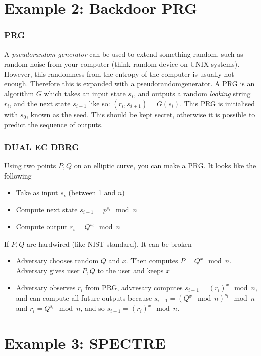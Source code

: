 \section{Example 2: Backdoor PRG}
\begin{frame}
    \frametitle{PRG}
        A \textit{pseudorandom generator} can be used to extend something random, such as random noise from your computer (think random device on UNIX systems). However, this randomness from the entropy of the computer is usually not enough. Therefore this is expanded with a pseudorandomgenerator. A PRG is an algorithm $G$ which takes an input state $s_i$, and outputs a random \textit{looking} string $r_i$, and the next state $s_{i + 1}$ like so: $(r_i, s_{i +1}) = G(s_i)$. This PRG is initialised with $s_0$, known as the seed. This should be kept secret, otherwise it is possible to predict the sequence of outputs. 
\end{frame}
    \begin{frame}
        \frametitle{DUAL EC DBRG}
            Using two points $P, Q$ on an elliptic curve, you can make a PRG. It looks like the following
            \begin{itemize}
                \item Take as input $s_i$ (between 1 and $n$)
                \item Compute next state $s_{i + 1} = p^{s_i} \mod n$
                \item Compute output $r_i = Q^{s_i} \mod n$
            \end{itemize}
            If $P, Q$ are hardwired (like NIST standard). It can be broken
            \begin{itemize}
                \item Adversary chooses random $Q$ and $x$. Then computes $P = Q^x \mod n$. Adversary gives user $P, Q$ to the user and keeps $x$
                \item Adversary observes $r_i$ from PRG, advresary computes $s_{i + 1} = (r_i)^x \mod n$, and can compute all future outputs because $s_{i + 1} = (Q^x \mod n)^{s_i} \mod n$ and $r_i = Q^{s_i} \mod n$, and so $s_{i + 1} = (r_i)^x \mod n$.  
            \end{itemize}
    \end{frame}


\section{Example 3: SPECTRE}

